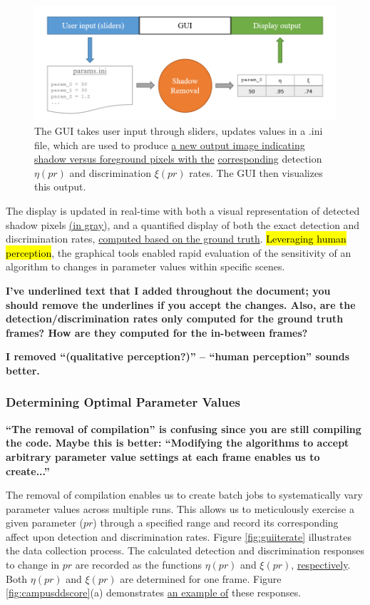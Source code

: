 \documentclass[12pt]{report}
\newcommand{\comment}[1]
           {\par {\bfseries \color{blue} #1 \par}}
\begin{document}
\begin{figure}
  \centering
 \includegraphics[width=1\linewidth]{figures/gui_model.png}
  \caption{The GUI takes user input through sliders, updates values in a .ini file, which are used to produce \underline{a new output image indicating shadow versus foreground pixels with the} \underline{corresponding} detection $\eta(pr)$ and discrimination $\xi(pr)$ rates. The GUI then visualizes this output.}
  \label{fig:guimodel}
\end{figure}

The display is updated in real-time with both a visual representation of detected shadow pixels \underline{(in gray)}, and a quantified display of both the exact detection and discrimination rates, \underline{computed based on the ground truth}. \hl{Leveraging human perception}, the graphical tools enabled rapid evaluation of the sensitivity of an algorithm to changes in parameter values within specific scenes.

\comment{I've underlined text that I added throughout the document; you should remove the underlines if you accept the changes.  Also, are the detection/discrimination rates only computed for the ground truth frames? How are they computed for the in-between frames?}

\comment{I removed ``(qualitative perception?)'' -- ``human perception'' sounds better.}

\subsubsection{Determining Optimal Parameter Values}
\comment{``The removal of compilation'' is confusing since you are still compiling the code.  Maybe this is better: ``Modifying the algorithms to accept arbitrary parameter value settings at each frame enables us to create...''}

The removal of compilation enables us to create batch jobs to systematically vary parameter values across multiple runs. This allows us to meticulously exercise a given parameter ($pr$) through a specified range and record its corresponding affect upon detection and discrimination rates. Figure \ref{fig:guiiterate} illustrates the data collection process. The calculated detection and discrimination responses to change in $pr$ are recorded as the functions $\eta(pr)$ and $\xi(pr)$, \underline{respectively}. Both $\eta(pr)$ and $\xi(pr)$ are determined for one frame. Figure \ref{fig:campusddscore}(a) demonstrates \underline{an example of} these responses.
\end{document}
